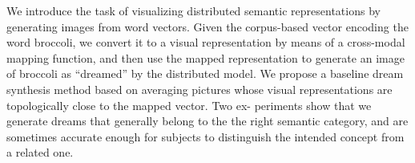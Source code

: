 We introduce the task of visualizing distributed semantic representations by generating images from word vectors. Given the corpus-based vector encoding the word broccoli, we convert it to a visual representation by means of a cross-modal mapping function, and then use the mapped representation to generate an image of broccoli as ``dreamed'' by the distributed model. We propose a baseline dream synthesis method based on averaging pictures whose visual representations are topologically close to the mapped vector. Two ex- periments show that we generate dreams that generally belong to the the right semantic category, and are sometimes accurate enough for subjects to distinguish the intended concept from a related one.
